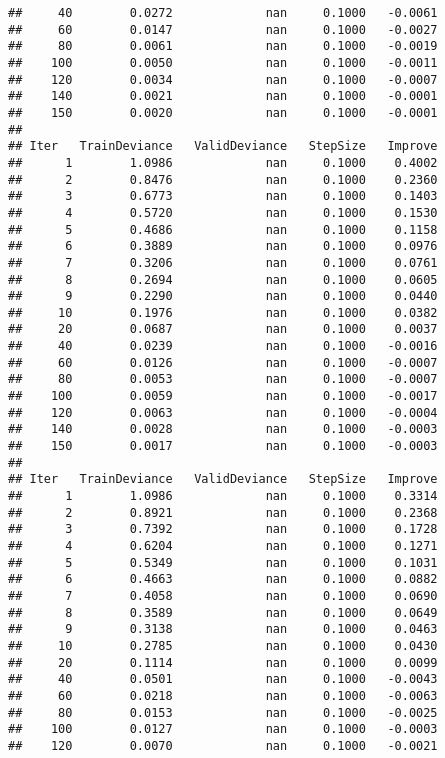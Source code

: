 \documentclass[
]{article}
\begin{document}
\begin{verbatim}
##     40        0.0272             nan     0.1000   -0.0061
##     60        0.0147             nan     0.1000   -0.0027
##     80        0.0061             nan     0.1000   -0.0019
##    100        0.0050             nan     0.1000   -0.0011
##    120        0.0034             nan     0.1000   -0.0007
##    140        0.0021             nan     0.1000   -0.0001
##    150        0.0020             nan     0.1000   -0.0001
## 
## Iter   TrainDeviance   ValidDeviance   StepSize   Improve
##      1        1.0986             nan     0.1000    0.4002
##      2        0.8476             nan     0.1000    0.2360
##      3        0.6773             nan     0.1000    0.1403
##      4        0.5720             nan     0.1000    0.1530
##      5        0.4686             nan     0.1000    0.1158
##      6        0.3889             nan     0.1000    0.0976
##      7        0.3206             nan     0.1000    0.0761
##      8        0.2694             nan     0.1000    0.0605
##      9        0.2290             nan     0.1000    0.0440
##     10        0.1976             nan     0.1000    0.0382
##     20        0.0687             nan     0.1000    0.0037
##     40        0.0239             nan     0.1000   -0.0016
##     60        0.0126             nan     0.1000   -0.0007
##     80        0.0053             nan     0.1000   -0.0007
##    100        0.0059             nan     0.1000   -0.0017
##    120        0.0063             nan     0.1000   -0.0004
##    140        0.0028             nan     0.1000   -0.0003
##    150        0.0017             nan     0.1000   -0.0003
## 
## Iter   TrainDeviance   ValidDeviance   StepSize   Improve
##      1        1.0986             nan     0.1000    0.3314
##      2        0.8921             nan     0.1000    0.2368
##      3        0.7392             nan     0.1000    0.1728
##      4        0.6204             nan     0.1000    0.1271
##      5        0.5349             nan     0.1000    0.1031
##      6        0.4663             nan     0.1000    0.0882
##      7        0.4058             nan     0.1000    0.0690
##      8        0.3589             nan     0.1000    0.0649
##      9        0.3138             nan     0.1000    0.0463
##     10        0.2785             nan     0.1000    0.0430
##     20        0.1114             nan     0.1000    0.0099
##     40        0.0501             nan     0.1000   -0.0043
##     60        0.0218             nan     0.1000   -0.0063
##     80        0.0153             nan     0.1000   -0.0025
##    100        0.0127             nan     0.1000   -0.0003
##    120        0.0070             nan     0.1000   -0.0021

\end{verbatim}
\end{document}
